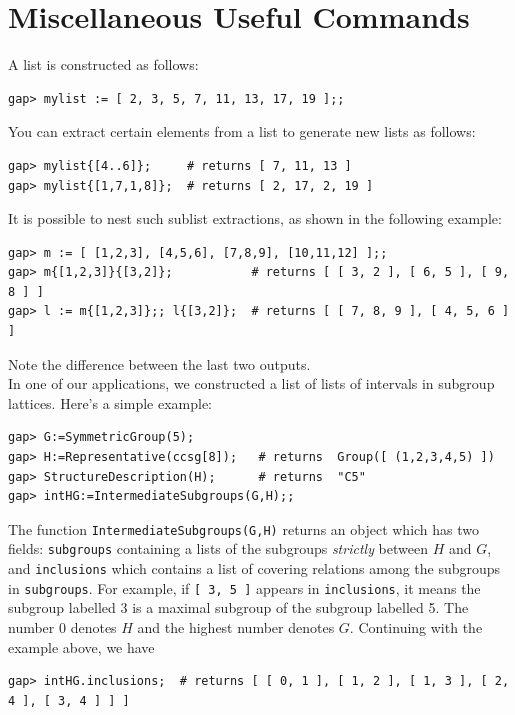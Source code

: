 \section{Miscellaneous Useful Commands}
\label{sec:lists}
A list is constructed as follows:
{\codesize
\begin{verbatim}
gap> mylist := [ 2, 3, 5, 7, 11, 13, 17, 19 ];;
\end{verbatim}}
\noindent You can extract certain elements from a list to generate new lists as follows:
{\codesize
\begin{verbatim}
gap> mylist{[4..6]};     # returns [ 7, 11, 13 ]
gap> mylist{[1,7,1,8]};  # returns [ 2, 17, 2, 19 ]
\end{verbatim}}
\noindent It is possible to nest such sublist extractions, as shown in the following example:
{\codesize
\begin{verbatim}
gap> m := [ [1,2,3], [4,5,6], [7,8,9], [10,11,12] ];; 
gap> m{[1,2,3]}{[3,2]};           # returns [ [ 3, 2 ], [ 6, 5 ], [ 9, 8 ] ]
gap> l := m{[1,2,3]};; l{[3,2]};  # returns [ [ 7, 8, 9 ], [ 4, 5, 6 ] ]
\end{verbatim}}
\noindent Note the difference between the last two outputs.
\\[4pt]
In one of our applications, we constructed a list of lists of intervals
in subgroup lattices.  Here's a simple example:
{\codesize
\begin{verbatim}
gap> G:=SymmetricGroup(5);
gap> H:=Representative(ccsg[8]);   # returns  Group([ (1,2,3,4,5) ])
gap> StructureDescription(H);      # returns  "C5"
gap> intHG:=IntermediateSubgroups(G,H);;
\end{verbatim}}
\noindent The function {\tt IntermediateSubgroups(G,H)} returns an object which has two fields:
{\tt subgroups} containing a lists of the subgroups \emph{strictly} between $H$ and
$G$, and {\tt inclusions} which contains a list of covering relations among the
subgroups in {\tt subgroups}.    For example, if {\tt [ 3, 5 ]} appears in
{\tt inclusions}, it means the subgroup labelled 3 is a maximal subgroup of the
subgroup labelled 5. 
The number 0 denotes $H$ and the highest number denotes $G$.  Continuing with
the example above, we have
{\codesize
\begin{verbatim}
gap> intHG.inclusions;  # returns [ [ 0, 1 ], [ 1, 2 ], [ 1, 3 ], [ 2, 4 ], [ 3, 4 ] ] ]
\end{verbatim}}
